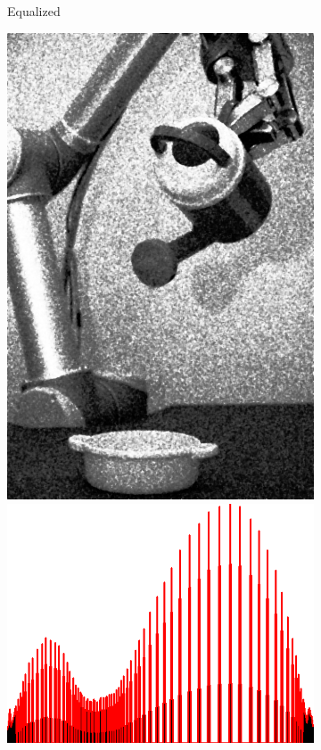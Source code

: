 \begin{figure}[H]
\begin{subfigure}[b]{0.3\textwidth}
        \caption{Equalized}
        \label{fig:img2_org}
    \end{subfigure}
    \begin{subfigure}[b]{0.3\textwidth}
        \includegraphics[width=\textwidth]{img2/eqlMedian.png}\\[0.1cm]
        \includegraphics[width=\textwidth]{img2/histE.png}

\end{subfigure}
\end{figure}
